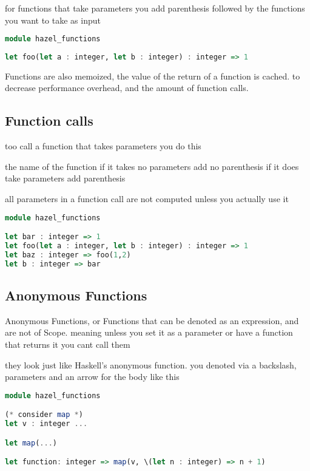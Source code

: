 \documentclass{article}
\begin{document}
for functions that take parameters you add parenthesis followed by the functions you want to take as input


\begin{lstlisting}[language=Haskell, caption=Functions with parameters]
module hazel_functions
        
let foo(let a : integer, let b : integer) : integer => 1

\end{lstlisting}

Functions are also memoized, the value of the return of a function is cached. to decrease performance overhead, and the amount of function calls. 
\subsection{Function calls}

too call a function that takes parameters you do this 

the name of the function if it takes no parameters add no parenthesis if it does 
take parameters add parenthesis 

all parameters in a function call are not computed unless you actually use it

\begin{lstlisting}[language=Haskell, caption=How to define a function call]
module hazel_functions

let bar : integer => 1
let foo(let a : integer, let b : integer) : integer => 1
let baz : integer => foo(1,2)
let b : integer => bar

\end{lstlisting}
\subsection{Anonymous Functions}

Anonymous Functions, or Functions that can be denoted as an expression, and are not of Scope. meaning unless you set it as a parameter or have a function that returns it you cant call them

they look just like Haskell's anonymous function.
you denoted via a backslash, parameters and an arrow for the body like this

\begin{lstlisting}[language=Haskell]
module hazel_functions

(* consider map *)
let v : integer ...

let map(...)

let function: integer => map(v, \(let n : integer) => n + 1)

\end{lstlisting}
\end{document}
